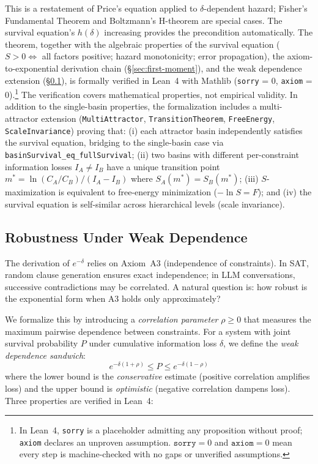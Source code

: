 \documentclass[11pt,a4paper]{article}
\begin{document}
This is a restatement of Price's equation \citep{price1970} applied to $\delta$-dependent hazard; Fisher's Fundamental Theorem \citep{fisher1930} and Boltzmann's H-theorem are special cases. The survival equation's $h(\delta)$ increasing provides the precondition automatically. The theorem, together with the algebraic properties of the survival equation ($S > 0 \Leftrightarrow$ all factors positive; hazard monotonicity; error propagation), the axiom-to-exponential derivation chain (\S\ref{sec:first-moment}), and the weak dependence extension (\S\ref{sec:weak-dependence}), is formally verified in Lean~4 \citep{demoura2021} with Mathlib (\texttt{sorry} = 0, \texttt{axiom} = 0).\footnote{In Lean~4, \texttt{sorry} is a placeholder admitting any proposition without proof; \texttt{axiom} declares an unproven assumption. $\texttt{sorry} = 0$ and $\texttt{axiom} = 0$ mean every step is machine-checked with no gaps or unverified assumptions.} The verification covers mathematical properties, not empirical validity. In addition to the single-basin properties, the formalization includes a multi-attractor extension (\texttt{MultiAttractor}, \texttt{TransitionTheorem}, \texttt{FreeEnergy}, \texttt{ScaleInvariance}) proving that: (i) each attractor basin independently satisfies the survival equation, bridging to the single-basin case via \texttt{basinSurvival\_eq\_fullSurvival}; (ii) two basins with different per-constraint information losses $I_A \neq I_B$ have a unique transition point $m^* = \ln(C_A/C_B)/(I_A - I_B)$ where $S_A(m^*) = S_B(m^*)$; (iii) $S$-maximization is equivalent to free-energy minimization ($-\ln S = F$); and (iv) the survival equation is self-similar across hierarchical levels (scale invariance).

\subsection{Robustness Under Weak Dependence}
\label{sec:weak-dependence}

The derivation of $e^{-\delta}$ relies on Axiom~A3 (independence of constraints). In SAT, random clause generation ensures exact independence; in LLM conversations, successive contradictions may be correlated. A natural question is: how robust is the exponential form when A3 holds only approximately?

We formalize this by introducing a \emph{correlation parameter} $\rho \geq 0$ that measures the maximum pairwise dependence between constraints. For a system with joint survival probability $P$ under cumulative information loss $\delta$, we define the \emph{weak dependence sandwich}:
\begin{equation}
e^{-\delta(1+\rho)} \leq P \leq e^{-\delta(1-\rho)}
\label{eq:sandwich}
\end{equation}
where the lower bound is the \emph{conservative} estimate (positive correlation amplifies loss) and the upper bound is \emph{optimistic} (negative correlation dampens loss). Three properties are verified in Lean~4:
\end{document}
